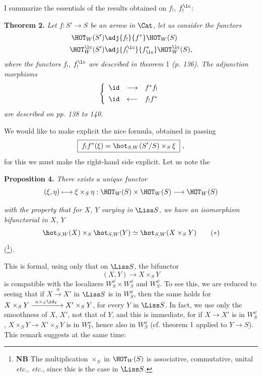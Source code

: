 I summarize the essentials of the results obtained on $f_!$, $f_!^{\lc}$:

\textbf{Theorem 2.} \textit{Let $f : S' \longrightarrow S$ be an arrow in} $\Cat$\textit{, let us consider the functors}
\[
\begin{aligned}
\HOT_W(S') &\adj{f_!}{f^*} \HOT_W(S) \\
\HOT^{\lc}_W(S') &\adj{f_!^{\lc}}{f^*_{\lc}} \HOT^{\lc}_W(S),
\end{aligned}
\]
\textit{where the functors $f_!$, $f_!^{\lc}$ are described in theorem} 1 \textit{(p. 136). The adjunction morphisms}
\[
\left\{
\begin{array}{lcl}
\id & \longrightarrow & f^*f_! \\[1ex]
\id & \longleftarrow & f_!f^*
\end{array}
\right.
\]
\textit{are described on pp. 138 to 140.}

We would like to make explicit the nice formula, obtained in passing
\[
\boxed{\;f_!f^*(\xi) = \hot_{S,W}(S'/S) \times_S \xi\;}\ ,
\]
for this we must make the right-hand side explicit. Let us note the

\textbf{Proposition 4.} \textit{There exists a unique functor}
\[
(\xi, \eta) \longmapsto \xi \times_S \eta : \HOT_W(S) \times \HOT_W(S) \longrightarrow \HOT_W(S)
\]



\textit{with the property that for $X$, $Y$ varying in} $\Liss S$\textit{, we have an isomorphism bifunctorial in $X$, $Y$}
\[
\hot_{S,W}(X) \times_S \hot_{S,W}(Y) \simeq \hot_{S,W}(X \times_S Y)
\tag*{$(*)$}
\]
(\footnote[72]{\textbf{NB} The multiplication $\times_S$ in $\HOT_W(S)$ is associative, commutative, unital \textit{etc., etc.}, since this is the case in $\Liss S$.}).

This is formal, using only that on $\Liss S$, the bifunctor
\[
(X, Y) \longrightarrow X \times_S Y
\]
is compatible with the localizers $W^{\dd}_S \times W^{\dd}_S$ and $W^{\dd}_S$. To see this, we are reduced to seeing that if $X \xrightarrow{u} X'$ in $\Liss S$ is in $W^{\dd}_S$, then the same holds for $X \times_S Y \xrightarrow{\ u\times_S \id_Y\ } X' \times_S Y$, for every
$Y$ in $\Liss S$. In fact, we use only the smoothness of $X$, $X'$, not that of $Y$, and this is immediate, for if $X \longrightarrow X'$ is in $W^{\dd}_S$, $X \times_S Y \longrightarrow X' \times_S Y$ is in $W^{\dd}_Y$, hence also in $W^{\dd}_S$ (cf. theorem 1 applied to $Y \longrightarrow S$). This remark suggests at the same time:

